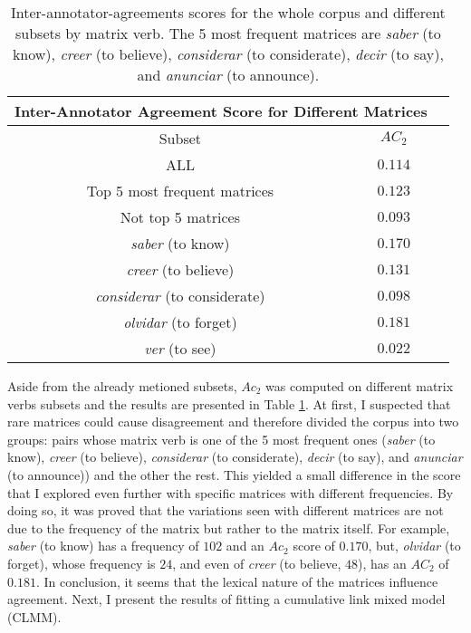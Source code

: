 \begin{table}
\center
\begin{tabular}{|c|c|c|}
\hline
\multicolumn{2}{|c|}{Inter-Annotator Agreement Score for Different Matrices}\\\hline
                     Subset & $AC_2$\\\hline 
ALL & $0.114$\\\hline 
Top 5 most frequent matrices & $0.123$\\\hline
Not top 5 matrices & $0.093$\\\hline
\textit{saber} (to know) & $0.170$\\\hline
\textit{creer} (to believe) & $0.131$\\\hline
\textit{considerar} (to considerate) & $0.098$\\\hline
\textit{olvidar} (to forget) & $0.181$\\\hline
\textit{ver} (to see) & $0.022$\\\hline
\end{tabular}
\caption[Ac2 matrices.]{Inter-annotator-agreements scores for the whole corpus and different subsets by matrix verb. The 5 most frequent matrices are \textit{saber} (to know), \textit{creer} (to believe), \textit{considerar} (to considerate), \textit{decir} (to say), and \textit{anunciar} (to announce).}
\label{tab:iaamatrix}
\end{table}

Aside from the already metioned subsets, $Ac_2$ was computed on different matrix verbs subsets and the results are presented in Table \ref{tab:iaamatrix}. At first, I suspected that rare matrices could cause disagreement and therefore divided the corpus into two groups: pairs whose matrix verb is one of the 5 most frequent ones (\textit{saber} (to know), \textit{creer} (to believe), \textit{considerar} (to considerate), \textit{decir} (to say), and \textit{anunciar} (to announce)) and the other the rest. This yielded a small difference in the score that I explored even further with specific matrices with different frequencies. By doing so, it was proved that the variations seen with different matrices are not due to the frequency of the matrix but rather to the matrix itself. For example, \textit{saber} (to know) has a frequency of $102$ and an $Ac_2$ score of $0.170$, but, \textit{olvidar} (to forget), whose frequency is $24$, and even of \textit{creer} (to believe, $48$), has an $AC_2$ of $0.181$. In conclusion, it seems that the lexical nature of the matrices influence agreement. Next, I present the results of fitting a cumulative link mixed model (CLMM).\\


